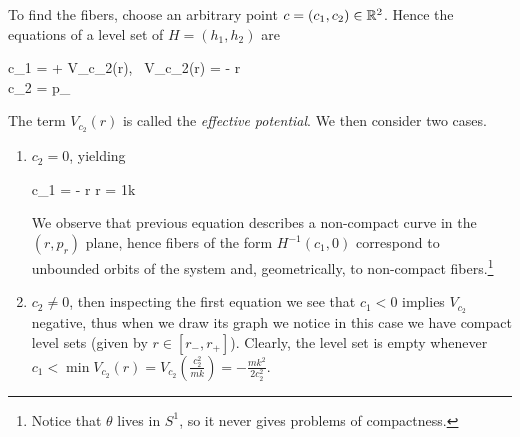 \documentclass[main.tex]{subfiles}
\begin{document}
\begin{example}
	To find the fibers, choose an arbitrary point $c = (c_1, c_2) \in \mathbb{R}^2$. Hence the equations of a level set of $H = (h_1, h_2)$ are
	\begin{eqalign}
	\label{eq:Kepler_level_set_eqs}
		\begin{dcases}
			c_1 =  + V_{c_2}(r), \quad {}\ V_{c_2}(r) =  - r\\
			c_2 = p_\theta
		\end{dcases}
	\end{eqalign}
	The term $V_{c_2}(r)$ is called the \emph{effective potential}. We then consider two cases.
	\begin{enumerate}
		\item $c_2 = 0$, yielding
		\begin{eqalign}
			c_1 =  - r \implies r = \frac1k \frac1{\frac{p_r^2}{2m} - c_1}
		\end{eqalign}
		We observe that previous equation describes a non-compact curve in the $(r, p_r)$ plane, hence fibers of the form $H^{-1}(c_1, 0)$ correspond to unbounded orbits of the system and, geometrically, to non-compact fibers.\footnote{Notice that $\theta$ lives in $S^1$, so it never gives problems of compactness.}
		\item $c_2 \neq 0$, then inspecting the first equation we see that $c_1 < 0$ implies $V_{c_2}$ negative, thus when we draw its graph we notice in this case we have compact level sets (given by $r \in [r_-, r_+]$). Clearly, the level set is empty whenever $c_1 < \min V_{c_2}(r) = V_{c_2} \left(\frac{c_2^2}{mk} \right) =  - \frac{mk^2}{2 c_2^2}$.
		

\end{enumerate}
\end{example}
\end{document}
